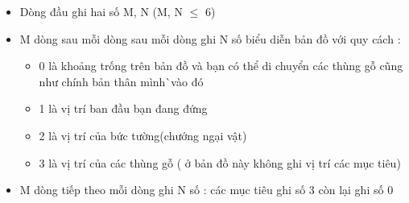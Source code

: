 \begin{itemize}
	\item Dòng đầu ghi hai số M, N (M, N  $\le$  6)
	\item M dòng sau mỗi dòng sau mỗi dòng ghi N số biểu diễn bản đồ với quy cách :
\begin{itemize}
	\item 0 là khoảng trống trên bản đồ và bạn có thể di chuyển các thùng gỗ cũng như chính bản thân mình^^ vào đó
	\item 1 là vị trí ban đầu bạn đang đứng
	\item 2 là vị trí của bức tường(chướng ngại vật)
	\item 3 là vị trí của các thùng gỗ ( ở bản đồ này không ghi vị trí các mục tiêu)
\end{itemize}
	\item M dòng tiếp theo mỗi dòng ghi N số : các mục tiêu ghi số 3 còn lại ghi số 0
\end{itemize}